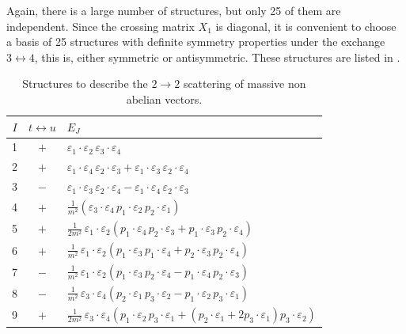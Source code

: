 Again, there is a large number of structures, but only 25 of them are independent.
Since the crossing matrix $X_1$ is diagonal, it is convenient to choose a basis of 25 structures with definite symmetry properties under the exchange $3 \leftrightarrow 4$, this is, either symmetric or antisymmetric. These structures are listed in .


\begin{table}[hbtp]
    \centering
    \caption{Structures to describe the $2 \to 2$ scattering of massive non abelian vectors.}
    
    \begin{tabular}{|c|c|>{\centering\arraybackslash}m{11.5cm}|}
        \hline 
        $I$ &  $t \leftrightarrow u$ & $E_J$ \\ \hline \hline 
        1 & $+$ & $\varepsilon_1 \cdot \varepsilon_2 \, \varepsilon_3 \cdot \varepsilon_4$ \\ \hline 
        2 & $+$ & $\varepsilon_1 \cdot \varepsilon_4 \, \varepsilon_2 \cdot \varepsilon_3 + \varepsilon_1 \cdot \varepsilon_3 \, \varepsilon_2 \cdot \varepsilon_4$ \\ \hline
        3 & $-$ & $\varepsilon_1 \cdot \varepsilon_3 \, \varepsilon_2 \cdot \varepsilon_4 - \varepsilon_1 \cdot \varepsilon_4 \, \varepsilon_2 \cdot \varepsilon_3$ \\ \hline 
        4 & $+$ & $\frac{1}{m^2} \left( \varepsilon_3 \cdot \varepsilon_4 \, p_1 \cdot \varepsilon_2 \, p_2 \cdot \varepsilon_1 \right)$ \\ \hline 
        5 & $+$ & $\frac{1}{2m^2} \, \varepsilon_1 \cdot \varepsilon_2 \left( p_1 \cdot \varepsilon_4 \, p_2 \cdot \varepsilon_3 + p_1 \cdot \varepsilon_3 \, p_2 \cdot \varepsilon_4 \right)$\\ \hline 
        6 & $+$ & $\frac{1}{m^2} \, \varepsilon_1 \cdot \varepsilon_2 \left( p_1 \cdot \varepsilon_3 \, p_1 \cdot \varepsilon_4 + p_2 \cdot \varepsilon_3 \, p_2 \cdot \varepsilon_4 \right)$ \\ \hline 
        7 & $-$ & $\frac{1}{m^2} \, \varepsilon_1 \cdot \varepsilon_2 \left( p_1 \cdot \varepsilon_3 \, p_2 \cdot \varepsilon_4 - p_1 \cdot \varepsilon_4 \, p_2 \cdot \varepsilon_3 \right)$ \\ \hline 
        8 & $-$ & $\frac{1}{m^2}\, \varepsilon_3 \cdot \varepsilon_4 \left( p_2 \cdot \varepsilon_1 \, p_3 \cdot \varepsilon_2 - p_1 \cdot \varepsilon_2 \, p_3 \cdot \varepsilon_1 \right)$ \\ \hline 
        9 & $+$ & $\frac{1}{2m^2} \, \varepsilon_3 \cdot \varepsilon_4 \left( p_1 \cdot \varepsilon_2 \, p_3 \cdot \varepsilon_1 + \left( p_2 \cdot \varepsilon_1 + 2 p_3 \cdot \varepsilon_1 \right) p_3 \cdot \varepsilon_2 \right)$ \\ \hline 

\end{tabular}
\end{table}
